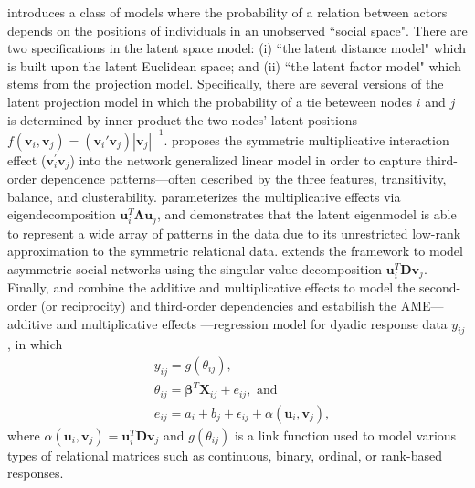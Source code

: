 \documentclass[a4paper]{article}
\begin{document}
 \cite{hoff2002latent} introduces a class of models where the probability of a relation between actors depends on the positions of individuals in an unobserved ``social space". There are two specifications in the latent space model: (i) ``the latent distance model" which is built upon the latent Euclidean space; and (ii) ``the latent factor model" which stems from the projection model. Specifically, there are several versions of the latent projection model in which the probability of a tie beteween nodes $i$ and $j$ is determined by inner product the two nodes' latent positions $f(\boldsymbol{v}_i, \boldsymbol{v}_j)={(\boldsymbol{v}_i'\boldsymbol{v}_j)}{|\boldsymbol{v}_j|^{-1}}$. \cite{hoff2005bilinear} proposes the symmetric multiplicative interaction effect ($\boldsymbol{v}_i^\prime \boldsymbol{v}_j$) into the network generalized linear model in order to capture third-order dependence patterns---often described by the three features, transitivity, balance, and clusterability. \cite{hoff2008modeling} parameterizes the multiplicative effects via eigendecomposition $\boldsymbol{u}_i^T\mathbf{\Lambda}\boldsymbol{u}_j$, and demonstrates that the latent eigenmodel is able to represent a wide array of patterns in the data due to its unrestricted low-rank approximation to the symmetric relational data. \cite{hoff2009multiplicative} extends the framework to model asymmetric social networks using the singular value decomposition $\boldsymbol{u}_i^T\mathbf{D}\boldsymbol{v}_j$. Finally, \cite{hoff2014amen} and \cite{minhas2016inferential} combine the additive and multiplicative effects to model the second-order (or reciprocity) and third-order dependencies and estabilish the AME---additive and multiplicative effects ---regression model for dyadic response data $y_{ij}$, in which 
	\begin{equation}\label{AME}
		\begin{aligned}
			&y_{ij} = g(\theta_{ij}),\\
			& \theta_{ij} = \boldsymbol{\beta}^T\mathbf{X}_{ij} + e_{ij}, \mbox{ and }\\
			& e_{ij} = a_i + b_j + \epsilon_{ij} + \alpha(\boldsymbol{u}_i, \boldsymbol{v}_j), 
		\end{aligned}
	\end{equation}
where $\alpha(\boldsymbol{u}_i, \boldsymbol{v}_j) = \boldsymbol{u}_i^T\mathbf{D}\boldsymbol{v}_j$ and $ g(\theta_{ij})$ is a link function used to model various types of relational matrices such as continuous, binary, ordinal, or rank-based responses.\\ \newline
\end{document}
